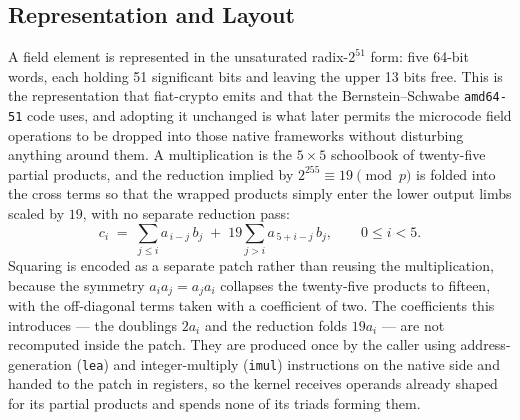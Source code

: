 \subsection{Representation and Layout}
\label{sec:c25519-field}

A field element is represented in the unsaturated radix-$2^{51}$ form: five
64-bit words, each holding 51 significant bits and leaving the upper 13 bits
free. This is the representation that fiat-crypto emits and that the
Bernstein--Schwabe \texttt{amd64-51} code uses, and adopting it unchanged is what
later permits the microcode field operations to be dropped into those native
frameworks without disturbing anything around them. A multiplication is the
$5\times5$ schoolbook of twenty-five partial products, and the reduction implied
by $2^{255}\equiv 19 \pmod p$ is folded into the cross terms so that the wrapped
products simply enter the lower output limbs scaled by $19$, with no separate
reduction pass:
\[
c_i \;=\; \sum_{j\le i} a_{\,i-j}\,b_j \;+\; 19\!\!\sum_{j>i} a_{\,5+i-j}\,b_j ,
\qquad 0 \le i < 5 .
\]
Squaring is encoded as a separate patch rather than reusing the multiplication,
because the symmetry $a_i a_j = a_j a_i$ collapses the twenty-five products to
fifteen, with the off-diagonal terms taken with a coefficient of two. The
coefficients this introduces --- the doublings $2a_i$ and the reduction folds
$19a_i$ --- are not recomputed inside the patch. They are produced once by the
caller using address-generation (\texttt{lea}) and integer-multiply
(\texttt{imul}) instructions on the native side and handed to the patch in
registers, so the kernel receives operands already shaped for its partial
products and spends none of its triads forming them.

